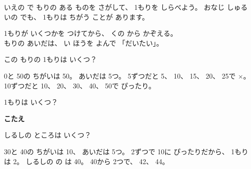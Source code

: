 \quad いえの で もりの ある ものを さがして、 \mbox{1もり}を しらべよう。 おなじ しゅるいの でも、 \mbox{1もり}は ちがう ことが あります。

\begin{taisetsu}
\mbox{1もり}が いくつかを つけてから、 くの から かぞえる。\\
もりの あいだは、 い ほうを よんで 「だいたい」。
\end{taisetsu}

\clearpage
\begin{reidai}
この もりの \mbox{1もり}は いくつ？
\begin{bkfigure}
\end{bkfigure}
\kangaekata 0と 50の ちがいは 50。 あいだは 5つ。 5ずつだと 5、 10、 15、 20、 25で ×。 10ずつだと 10、 20、 30、 40、 50で ぴったり。 
\end{reidai}

\begin{jibun}
\noindent\begin{minipage}[c]{0.6\linewidth}\centering
{}
\end{minipage}\hfill
\begin{minipage}[c]{0.38\linewidth}\raggedleft
\mbox{1もり}は いくつ？\par\vspace{2pt}
{\sffamily\bfseries\small\color{bkOrange}こたえ}\enspace\bkkakikomi[16mm]
\end{minipage}
\end{jibun}

\begin{reidai}
\noindent\begin{minipage}[c]{0.4\linewidth}
しるしの ところは いくつ？
\end{minipage}\hfill
\begin{minipage}[c]{0.58\linewidth}\raggedleft
{}
\end{minipage}
\par\vspace{2pt}
\kangaekata 30と 40の ちがいは 10、 あいだは 5つ。 2ずつで 10に ぴったりだから、 \mbox{1もり}は 2。 しるしの の は 40。 40から 2つで、 42、 44。 
\end{reidai}

